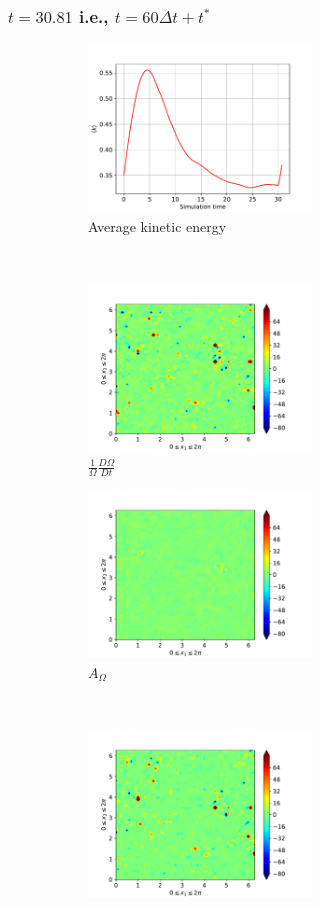 \subsubsection{$t=30.81$ i.e., $t=60\Delta t + t^{\ast}$}
\begin{figure}[H]
    \begin{subfigure}[H]{0.45\textwidth}
        \includegraphics[height=1.75in]{media/run-cds-65/ke-average1380}
        \caption{Average kinetic energy}
    \end{subfigure}
    ~
    \begin{subfigure}[H]{0.45\textwidth}
        \includegraphics[height=1.75in]{media/run-cds-65/enst-1380}
        \caption{$\frac{1}{\Omega} \frac{D \Omega}{Dt}$}
    \end{subfigure}
    \newline
    \begin{subfigure}{0.45\textwidth}
        \includegraphics[height=1.75in]{media/run-cds-65/A-enst-1380}
        \caption{$A_{\Omega}$}
    \end{subfigure}
    ~
    \begin{subfigure}{0.45\textwidth}
        \includegraphics[height=1.75in]{media/run-cds-65/Pi-enst-1380}

\end{subfigure}
\end{figure}
